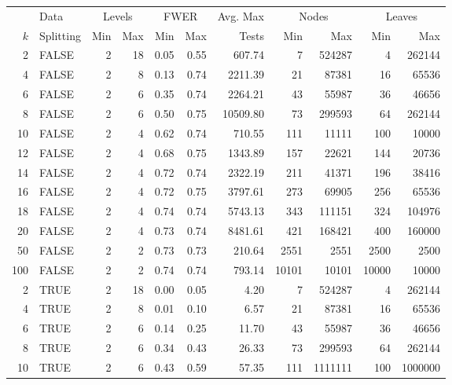 \begin{table}[H]
\centering
\begin{tabular}{rlrrrrrrrrr}
  \toprule
  &Data&\multicolumn{2}{c}{Levels} &\multicolumn{2}{c}{FWER} & Avg. Max &
  \multicolumn{2}{c}{Nodes} & \multicolumn{2}{c}{Leaves}\\ $k$ & Splitting & Min & Max & Min & Max & Tests & Min & Max & Min & Max \\ \midrule
  2 & FALSE &   2 &  18 & 0.05 & 0.55 & 607.74 &   7 & 524287 &   4 & 262144 \\ 
    4 & FALSE &   2 &   8 & 0.13 & 0.74 & 2211.39 &  21 & 87381 &  16 & 65536 \\ 
    6 & FALSE &   2 &   6 & 0.35 & 0.74 & 2264.21 &  43 & 55987 &  36 & 46656 \\ 
    8 & FALSE &   2 &   6 & 0.50 & 0.75 & 10509.80 &  73 & 299593 &  64 & 262144 \\ 
   10 & FALSE &   2 &   4 & 0.62 & 0.74 & 710.55 & 111 & 11111 & 100 & 10000 \\ 
   12 & FALSE &   2 &   4 & 0.68 & 0.75 & 1343.89 & 157 & 22621 & 144 & 20736 \\ 
   14 & FALSE &   2 &   4 & 0.72 & 0.74 & 2322.19 & 211 & 41371 & 196 & 38416 \\ 
   16 & FALSE &   2 &   4 & 0.72 & 0.75 & 3797.61 & 273 & 69905 & 256 & 65536 \\ 
   18 & FALSE &   2 &   4 & 0.74 & 0.74 & 5743.13 & 343 & 111151 & 324 & 104976 \\ 
   20 & FALSE &   2 &   4 & 0.73 & 0.74 & 8481.61 & 421 & 168421 & 400 & 160000 \\ 
   50 & FALSE &   2 &   2 & 0.73 & 0.73 & 210.64 & 2551 & 2551 & 2500 & 2500 \\ 
  100 & FALSE &   2 &   2 & 0.74 & 0.74 & 793.14 & 10101 & 10101 & 10000 & 10000 \\ 
    2 & TRUE &   2 &  18 & 0.00 & 0.05 & 4.20 &   7 & 524287 &   4 & 262144 \\ 
    4 & TRUE &   2 &   8 & 0.01 & 0.10 & 6.57 &  21 & 87381 &  16 & 65536 \\ 
    6 & TRUE &   2 &   6 & 0.14 & 0.25 & 11.70 &  43 & 55987 &  36 & 46656 \\ 
    8 & TRUE &   2 &   6 & 0.34 & 0.43 & 26.33 &  73 & 299593 &  64 & 262144 \\ 
   10 & TRUE &   2 &   6 & 0.43 & 0.59 & 57.35 & 111 & 1111111 & 100 & 1000000 \\ 

\end{tabular}
\end{table}
